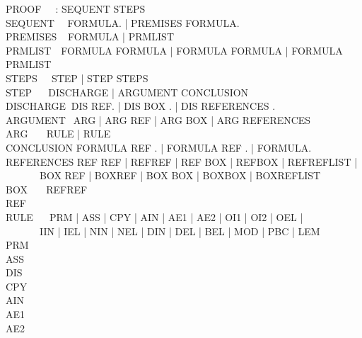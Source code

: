 \documentclass[manual.tex]{subfiles}
\begin{document}
\newcommand{\id}{{\bf id}}
{\ttfamily
\noindent
PROOF $~~~~~$\tra \id: SEQUENT STEPS\\
SEQUENT $~~~$\tra {} FORMULA. | 
                   PREMISES FORMULA.\\
PREMISES $~~$\tra {} FORMULA
                |  PRMLIST\\
PRMLIST $~~~$\tra FORMULA  FORMULA
                | FORMULA FORMULA 
                | FORMULA\txt{, } PRMLIST\\
STEPS $~~~~~$\tra STEP | STEP STEPS\\
STEP $~~~~~~$\tra DISCHARGE | ARGUMENT CONCLUSION\\
DISCHARGE $~$\tra DIS REF. | DIS BOX . | DIS REFERENCES .\\
ARGUMENT $~~$\tra ARG | ARG REF | ARG BOX | ARG REFERENCES\\
ARG $~~~~~~~$\tra RULE  | RULE\\
CONCLUSION   \tra FORMULA REF . |  FORMULA REF . 
                |  FORMULA.\\
REFERENCES   \tra REF REF | REFREF |
                  REF BOX | REFBOX |
                  REF\txt{, }REFLIST |\\
$~~~~~~~~~~~~~~$  BOX REF | BOXREF |
                  BOX BOX | BOXBOX |
                  BOX\txt{, }REFLIST\\
BOX $~~~~~~~$\tra REF\txt{-}REF\\
REF $~~~~~~~$\tra [\id]\\
RULE $~~~~~~$\tra PRM | ASS | CPY | AIN | AE1 | AE2 | OI1 | OI2 | OEL |\\
$~~~~~~~~~~~~~~$  IIN | IEL | NIN | NEL | DIN | DEL | BEL | MOD | PBC | LEM\\
PRM $~~~~~~~$\tra{}\\
ASS $~~~~~~~$\tra{}\\
DIS $~~~~~~~$\tra{}\\
CPY $~~~~~~~$\tra{}\\
AIN $~~~~~~~$\tra{}\\
AE1 $~~~~~~~$\tra{}\\
AE2 $~~~~~~~$\tra{}\\
}
\end{document}
